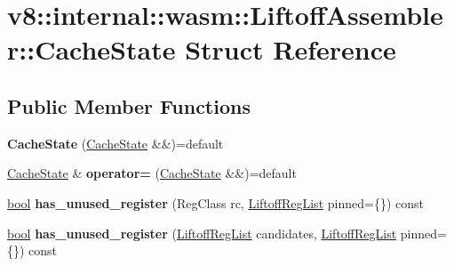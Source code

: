 \hypertarget{structv8_1_1internal_1_1wasm_1_1LiftoffAssembler_1_1CacheState}{}\section{v8\+:\+:internal\+:\+:wasm\+:\+:Liftoff\+Assembler\+:\+:Cache\+State Struct Reference}
\label{structv8_1_1internal_1_1wasm_1_1LiftoffAssembler_1_1CacheState}
\subsection*{Public Member Functions}
\begin{DoxyCompactItemize}
\item 
\mbox{\label{structv8_1_1internal_1_1wasm_1_1LiftoffAssembler_1_1CacheState_a73c6c91f08985fc09cda83b236a5e290}} 
{\bfseries Cache\+State} (\mbox{\hyperlink{structv8_1_1internal_1_1wasm_1_1LiftoffAssembler_1_1CacheState}{Cache\+State}} \&\&)=default
\item 
\mbox{\label{structv8_1_1internal_1_1wasm_1_1LiftoffAssembler_1_1CacheState_ab4854ab3f9ef0df9fe5bfc8063961981}} 
\mbox{\hyperlink{structv8_1_1internal_1_1wasm_1_1LiftoffAssembler_1_1CacheState}{Cache\+State}} \& {\bfseries operator=} (\mbox{\hyperlink{structv8_1_1internal_1_1wasm_1_1LiftoffAssembler_1_1CacheState}{Cache\+State}} \&\&)=default
\item 
\mbox{\label{structv8_1_1internal_1_1wasm_1_1LiftoffAssembler_1_1CacheState_ac7de89e3a8af938538518b4369a9ce32}} 
\mbox{\hyperlink{classbool}{bool}} {\bfseries has\+\_\+unused\+\_\+register} (Reg\+Class rc, \mbox{\hyperlink{classv8_1_1internal_1_1wasm_1_1LiftoffRegList}{Liftoff\+Reg\+List}} pinned=\{\}) const
\item 
\mbox{\label{structv8_1_1internal_1_1wasm_1_1LiftoffAssembler_1_1CacheState_a4021d51729e98f434eebc98396c20d44}} 
\mbox{\hyperlink{classbool}{bool}} {\bfseries has\+\_\+unused\+\_\+register} (\mbox{\hyperlink{classv8_1_1internal_1_1wasm_1_1LiftoffRegList}{Liftoff\+Reg\+List}} candidates, \mbox{\hyperlink{classv8_1_1internal_1_1wasm_1_1LiftoffRegList}{Liftoff\+Reg\+List}} pinned=\{\}) const

\end{DoxyCompactItemize}
